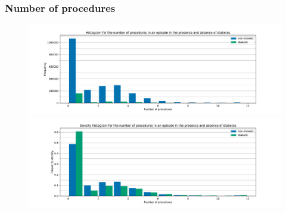 \documentclass{beamer}
\begin{document}
\begin{frame}
    \frametitle{Number of procedures}

    \begin{figure}
        \begin{minipage}{\linewidth}
            \includegraphics[width=\linewidth]
                {./img/diabetic_proc_no_freq_hist.pdf}
        \end{minipage}
        \begin{minipage}{\linewidth}
            \includegraphics[width=\linewidth]
                {./img/diabetic_proc_no_density_hist.pdf}
        \end{minipage}
    \end{figure}
\end{frame}
\end{document}
